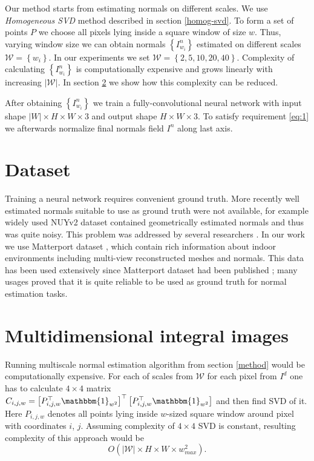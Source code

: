 Our method starts from estimating normals on different scales. We use \textit{Homogeneous SVD} method described in section \ref{homog-svd}. To form a set of points $P$ we choose all pixels lying inside a square window of size $w$. Thus, varying window size we can obtain normals $\left\{I^n_{w_i}\right\}$ estimated on different scales $\mathcal{W} = \left\{w_i\right\}$. In our experiments we set $\mathcal{W} = \left\{2, 5, 10, 20, 40\right\}$. Complexity of calculating $\left\{I^n_{w_i}\right\}$ is computationally expensive and grows linearly with increasing  $\left|\mathcal{W}\right|$. In section \ref{integ-im} we show how this complexity can be reduced.

After obtaining $\left\{I^n_{w_i}\right\}$ we train a fully-convolutional neural network with input shape $\left|W\right| \times H \times W \times 3$ and output shape $H \times W \times 3$. To satisfy requirement \ref{eq:1} we afterwards normalize final normals field $I^n$ along last axis.

\section{Dataset}

Training a neural network requires convenient ground truth. More recently well estimated normals suitable to use as ground truth were not available, for example widely used NUYv2 dataset contained geometrically estimated normals and thus was quite noisy. This problem was addressed by several researchers \cite{matterport, physically-based-rendering}. In our work we use Matterport dataset \cite{matterport}, which contain rich information about indoor environments including multi-view reconstructed meshes and normals. This data has been used extensively since Matterport dataset had been published \cite{deep_surf, deep_depth_compl}; many usages proved that it is quite reliable to be used as ground truth for normal estimation tasks.

\section{Multidimensional integral images} \label{integ-im}

Running multiscale normal estimation algorithm from section \ref{method} would be computationally expensive. For each of scales from $\mathcal{W}$ for each pixel from $I^d$ one has to calculate $4 \times 4$ matrix $C_{i,j,w} = \left[P_{i,j,w}^\top \mathbbm{1}_{w^2} \right]^\top \left[P_{i,j,w}^\top \mathbbm{1}_{w^2} \right]$ and then find SVD of it. Here $P_{i,j,w}$ denotes all points lying inside $w$-sized square window around pixel with coordinates $i$, $j$. Assuming complexity of $4  \times 4$ SVD is constant, resulting complexity of this approach would be 
\[
O\left(\left|\mathcal{W}\right| \times H \times W \times w_{max} ^ 2\right).
\]

